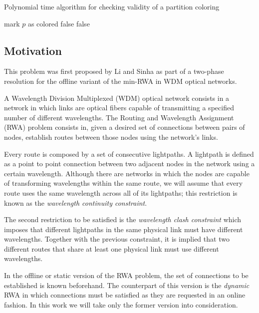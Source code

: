 \begin{algorithm}
\caption{Polynomial time algorithm for checking validity of a partition coloring}
\label{alg:pcpvalidity}
\begin{algorithmic}

			\STATE mark $p$ as colored
					\RETURN false
				\ENDIF	
			\ENDFOR
		\ENDIF
	\ENDFOR
		\RETURN false
	\ENDIF	
\ENDFOR

\end{algorithmic}
\end{algorithm}

\subsection{Motivation}

This problem was first proposed by Li and Sinha \cite{Li00thepartition} as part of a two-phase resolution for the offline variant of the min-RWA in WDM optical networks.

A Wavelength Division Multiplexed (WDM) optical network consists in a network in which links are optical fibers capable of transmitting a specified number of different wavelengths. The Routing and Wavelength Assignment (RWA) problem consists in, given a desired set of connections between pairs of nodes, establish routes between those nodes using the network's links.

Every route is composed by a set of consecutive lightpaths. A lightpath is defined as a point to point connection between two adjacent nodes in the network using a certain wavelength. Although there are networks in which the nodes are capable of transforming wavelengths within the same route, we will assume that every route uses the same wavelength across all of its lightpaths; this restriction is known as the \textit{wavelength continuity constraint}.

The second restriction to be satisfied is the \textit{wavelength clash constraint} which imposes that different lightpaths in the same physical link must have different wavelengths. Together with the previous constraint, it is implied that two different routes that share at least one physical link must use different wavelengths.

In the offline or static version of the RWA problem, the set of connections to be established is known beforehand. The counterpart of this version is the \textit{dynamic} RWA in which connections must be satisfied as they are requested in an online fashion. In this work we will take only the former version into consideration.

